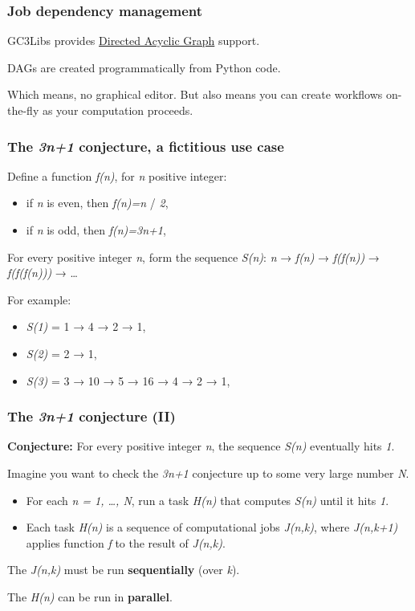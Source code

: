 \documentclass[presentation]{beamer}
\begin{document}
\begin{frame}
\frametitle{Job dependency management}
\label{sec-23}

  GC3Libs provides \href{http://en.wikipedia.org/wiki/Directed_acyclic_graph}{Directed Acyclic Graph} support.

  DAGs are created programmatically from Python code.

  Which means, no graphical editor.  But also means you can create
  workflows on-the-fly as your computation proceeds.
\end{frame}
\begin{frame}
\frametitle{The \emph{3n+1} conjecture, a fictitious use case}
\label{sec-24}

  Define a function \emph{f(n)}, for \emph{n} positive integer:
\begin{itemize}
\item if \emph{n} is even, then \emph{f(n)=n} / \emph{2},
\item if \emph{n} is odd, then \emph{f(n)=3n+1},
\end{itemize}
  For every positive integer \emph{n}, form the sequence \emph{S(n)}:
  \emph{n} → \emph{f(n)} → \emph{f(f(n))} → \emph{f(f(f(n)))} → \ldots{}

  For example:
\begin{itemize}
\item \emph{S(1)} = 1 → 4 → 2 → 1,
\item \emph{S(2)} = 2 → 1,
\item \emph{S(3)} = 3 → 10 → 5 → 16 → 4 → 2 → 1,
\end{itemize}
\end{frame}
\begin{frame}
\frametitle{The \emph{3n+1} conjecture (II)}
\label{sec-25}

  \textbf{Conjecture:} For every positive integer \emph{n}, the sequence \emph{S(n)}
  eventually hits \emph{1}.

  Imagine you want to check the \emph{3n+1} conjecture up to some very
  large number \emph{N}.
\begin{itemize}
\item For each \emph{n = 1, \ldots{}, N}, run a task \emph{H(n)} that computes
    \emph{S(n)} until it hits \emph{1}.
\item Each task \emph{H(n)} is a sequence of computational jobs \emph{J(n,k)},
    where \emph{J(n,k+1)} applies function \emph{f} to the result of \emph{J(n,k)}.
\end{itemize}

  The \emph{J(n,k)} must be run \textbf{sequentially} (over \emph{k}).

  The \emph{H(n)} can be run in \textbf{parallel}.
\end{frame}
\end{document}
